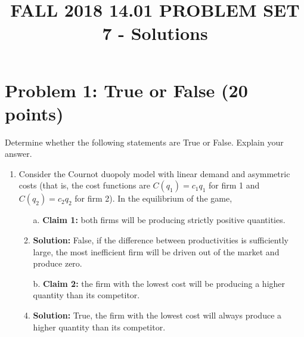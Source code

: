 \documentclass{article}
\title{FALL 2018 14.01 PROBLEM SET 7 - Solutions}
\begin{document}
\maketitle

\section*{Problem 1: True or False (20 points)}
Determine whether the following statements are True or False. Explain your answer.
\begin{enumerate}
    \item Consider the Cournot duopoly model with linear demand and asymmetric costs (that is, the cost functions are $C(q_{1}) = c_{1}q_{1}$ for firm 1 and $C(q_{2}) = c_{2}q_{2}$ for firm 2). In the equilibrium of the game,
    \begin{enumerate}
      \item [a.] \textbf{Claim 1:} both firms will be producing strictly positive quantities.
      \item \textbf{Solution:} False, if the difference between productivities is sufficiently large, the most inefficient firm will be driven out of the market and produce zero.
      \item [b.] \textbf{Claim 2:} the firm with the lowest cost will be producing a higher quantity than its competitor.
      \item \textbf{Solution:} True, the firm with the lowest cost will always produce a higher quantity than its competitor.
    \end{enumerate}
\end{enumerate}
\end{document}
